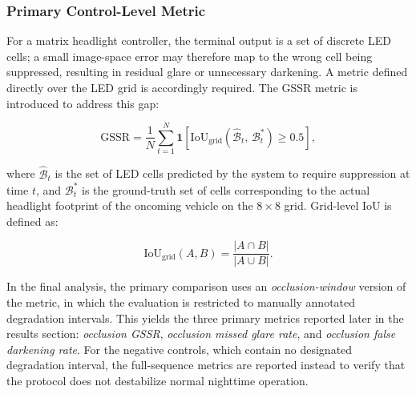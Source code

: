\documentclass[pdflatex,sn-mathphys-num]{sn-jnl}%
\theoremstyle{thmstyleone}%
\theoremstyle{thmstyletwo}%
\theoremstyle{thmstylethree}%
\begin{document}
\subsubsection{Primary Control-Level Metric}

\label{subsec:gssr}

For a matrix headlight controller, the terminal output is a set of
discrete LED cells; a small image-space error may therefore map to the
wrong cell being suppressed, resulting in residual glare or unnecessary
darkening. A metric defined directly over the LED grid is accordingly
required. The GSSR metric is introduced to address this gap:

\begin{equation}
\mathrm{GSSR} = \frac{1}{N} \sum_{t=1}^{N}
\mathbf{1}\!\left[
  \mathrm{IoU}_{\mathrm{grid}}\!\left(\hat{\mathcal{B}}_t,\,
  \mathcal{B}^{*}_t\right) \geq 0.5
\right],
\label{eq:gssr}
\end{equation}

\noindent where $\hat{\mathcal{B}}_t$ is the set of LED cells predicted
by the system to require suppression at time $t$, and
$\mathcal{B}^{*}_t$ is the ground-truth set of cells corresponding to
the actual headlight footprint of the oncoming vehicle on the
$8 \times 8$ grid. Grid-level IoU is defined as:

\begin{equation}
\mathrm{IoU}_{\mathrm{grid}}(A,B) =
\frac{|A \cap B|}{|A \cup B|}.
\label{eq:grid_iou}
\end{equation}

In the final analysis, the primary comparison uses an
\emph{occlusion-window} version of the metric, in which the evaluation
is restricted to manually annotated degradation intervals. This yields
the three primary metrics reported later in the results section:
\emph{occlusion GSSR}, \emph{occlusion missed glare rate}, and
\emph{occlusion false darkening rate}. For the negative controls, which
contain no designated degradation interval, the full-sequence metrics
are reported instead to verify that the protocol does not destabilize
normal nighttime operation.
\end{document}
